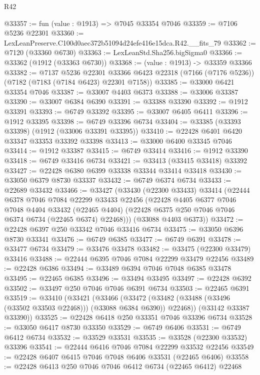 \begin{lexlean}{R42}
\begin{coremodule}
{@33357 := fun (value : @1913) => @7045 @33354 @7046
@33359 := @7106 @5236 @22301
@33360 := LexLeanPreserve.C100d0aec372b51094d24efe416e15dca.R42.__fits_79
@33362 := @7120 (@33360 @6730)
@33363 := LexLeanStd.Sha256.bigSigma0
@33366 := @33362 (@1912 (@33363 @6730))
@33368 := (value : @1913) -> @33359 @33366
@33382 := @7137
    @5236
    @22301
    @33366
    @6423
    @22318
    (@7166 (@7176 @5236))
    (@7182 (@7183 (@7184 @6423) @22301 @7158))
@33385 := @33000 @6421 @33354 @7046
@33387 := @33007 @4403 @6373
@33388 := @33006 @33387
@33390 := @33007 @6384 @6390
@33391 := @33388 @33390
@33392 := @1912 @33391
@33393 := @6749 @33392
@33395 := @33007 @6405 @6411
@33396 := @1912 @33395
@33398 := @6749 @33396 @6734
@33404 := @33385 (@33393 @33398) (@1912 (@33006 @33391 @33395))
@33410 := @22428 @6401 @6420 @33347 @33353 @33392 @33398
@33413 := @33000 @6400 @33345 @7046
@33414 := @1912 @33387
@33415 := @6749 @33414
@33416 := @1912 @33390
@33418 := @6749 @33416 @6734
@33421 := @33413 (@33415 @33418) @33392
@33427 := @22428 @6380 @6399 @33338 @33344 @33414 @33418
@33430 := @33050 @6379 @8730 @33337
@33432 := @6749 @6374 @6734
@33433 := @22689 @33432
@33466 := @33427
    (@33430
      (@22300 @33433)
      @33414
      (@22444
        @6378
        @7046
        @7084
        @22299
        @33433
        @22456
        (@22428
          @4405
          @6377
          @7046
          @7048
          @4404
          @33432
          (@22465 @4404)
          (@22428 @6375 @250 @7046 @7046 @6374 @6734 (@22465 @6374) @22468)))
      (@33088 @4403 @6373))
@33472 := @22428 @6397 @250 @33342 @7046 @33416 @6734
@33475 := @33050 @6396 @8730 @33341
@33476 := @6749 @6385
@33477 := @6749 @6391
@33478 := @33477 @6734
@33479 := @33476 @33478
@33482 := @33475 (@22300 @33479) @33416
@33488 := @22444 @6395 @7046 @7084 @22299 @33479 @22456
@33489 := @22428 @6386
@33494 := @33489 @6394 @7046 @7048 @6385 @33478
@33495 := @22465 @6385
@33496 := @33494 @33495
@33497 := @22428 @6392
@33502 := @33497 @250 @7046 @7046 @6391 @6734
@33503 := @22465 @6391
@33519 := @33410
    (@33421
      (@33466
        (@33472 (@33482 (@33488 (@33496 (@33502 @33503 @22468))) (@33088 @6384 @6390)) @22468))
      (@33142 @33387 @33390))
@33525 := @22428 @6418 @250 @33351 @7046 @33396 @6734
@33528 := @33050 @6417 @8730 @33350
@33529 := @6749 @6406
@33531 := @6749 @6412 @6734
@33532 := @33529 @33531
@33535 := @33528 (@22300 @33532) @33396
@33541 := @22444 @6416 @7046 @7084 @22299 @33532 @22456
@33549 := @22428 @6407 @6415 @7046 @7048 @6406 @33531 (@22465 @6406)
@33558 := @22428 @6413 @250 @7046 @7046 @6412 @6734 (@22465 @6412) @22468
}
\end{coremodule}
\end{lexlean}
